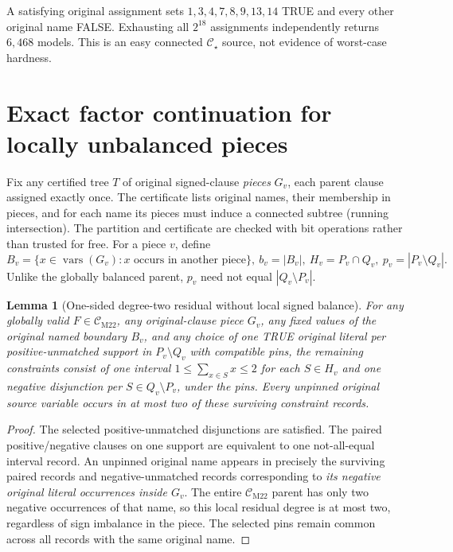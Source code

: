 \documentclass[11pt]{article}
\newtheorem{lemma}[theorem]{Lemma}
\newcommand{\CM}{\mathcal C_{\mathrm{M22}}}
\newcommand{\CS}{\mathcal C_{\star}}
\begin{document}
A satisfying original assignment sets \(1,3,4,7,8,9,13,14\) TRUE and every other original name FALSE. Exhausting all \(2^{18}\) assignments independently returns \(6{,}468\) models. This is an easy connected \(\CS\) source, not evidence of worst-case hardness.

\section{Exact factor continuation for locally unbalanced pieces}
Fix any certified tree \(T\) of original signed-clause \emph{pieces} \(G_v\), each parent clause assigned exactly once. The certificate lists original names, their membership in pieces, and for each name its pieces must induce a connected subtree (running intersection). The partition and certificate are checked with bit operations rather than trusted for free. For a piece \(v\), define
\[
 B_v=\{x\in\operatorname{vars}(G_v): x\text{ occurs in another piece}\},\
 b_v=|B_v|,\
 H_v=P_v\cap Q_v,\
 p_v=|P_v\setminus Q_v|.
\]
Unlike the globally balanced parent, \(p_v\) need not equal \(|Q_v\setminus P_v|\).

\begin{lemma}[One-sided degree-two residual without local signed balance]
For any \emph{globally valid} \(F\in\CM\), any original-clause piece \(G_v\), any fixed values of the original named boundary \(B_v\), and any choice of one TRUE original literal per positive-unmatched support in \(P_v\setminus Q_v\) with compatible pins, the remaining constraints consist of one interval \(1\le\sum_{x\in S}x\le2\) for each \(S\in H_v\) and one negative disjunction per \(S\in Q_v\setminus P_v\), under the pins. Every unpinned original source variable occurs in at most two of these surviving constraint \emph{records}.
\end{lemma}
\begin{proof}
The selected positive-unmatched disjunctions are satisfied. The paired positive/negative clauses on one support are equivalent to one not-all-equal interval record. An unpinned original name appears in precisely the surviving paired records and negative-unmatched records corresponding to \emph{its negative original literal occurrences inside \(G_v\)}. The entire \(\CM\) parent has only two negative occurrences of that name, so this local residual degree is at most two, regardless of sign imbalance in the piece. The selected pins remain common across all records with the same original name.
\end{proof}
\end{document}
